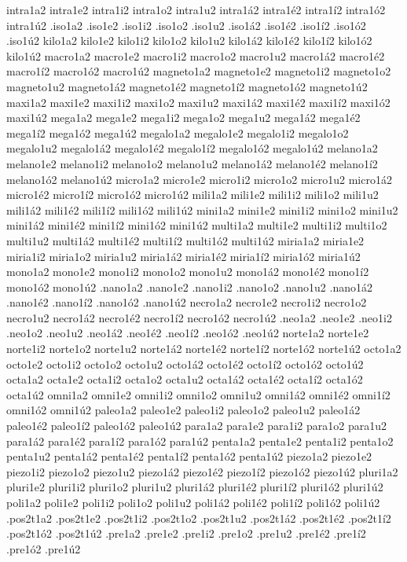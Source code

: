 {intra1a2 intra1e2 intra1i2 intra1o2 intra1u2 intra1á2 intra1é2 intra1í2 intra1ó2 intra1ú2 
.iso1a2 .iso1e2 .iso1i2 .iso1o2 .iso1u2 .iso1á2 .iso1é2 .iso1í2 .iso1ó2 .iso1ú2 
kilo1a2 kilo1e2 kilo1i2 kilo1o2 kilo1u2 kilo1á2 kilo1é2 kilo1í2 kilo1ó2 kilo1ú2 
macro1a2 macro1e2 macro1i2 macro1o2 macro1u2 macro1á2 macro1é2 macro1í2 macro1ó2 macro1ú2 
magneto1a2 magneto1e2 magneto1i2 magneto1o2 magneto1u2 magneto1á2 magneto1é2 magneto1í2 magneto1ó2 magneto1ú2 
maxi1a2 maxi1e2 maxi1i2 maxi1o2 maxi1u2 maxi1á2 maxi1é2 maxi1í2 maxi1ó2 maxi1ú2 
mega1a2 mega1e2 mega1i2 mega1o2 mega1u2 mega1á2 mega1é2 mega1í2 mega1ó2 mega1ú2 
megalo1a2 megalo1e2 megalo1i2 megalo1o2 megalo1u2 megalo1á2 megalo1é2 megalo1í2 megalo1ó2 megalo1ú2 
melano1a2 melano1e2 melano1i2 melano1o2 melano1u2 melano1á2 melano1é2 melano1í2 melano1ó2 melano1ú2 
micro1a2 micro1e2 micro1i2 micro1o2 micro1u2 micro1á2 micro1é2 micro1í2 micro1ó2 micro1ú2 
mili1a2 mili1e2 mili1i2 mili1o2 mili1u2 mili1á2 mili1é2 mili1í2 mili1ó2 mili1ú2 
mini1a2 mini1e2 mini1i2 mini1o2 mini1u2 mini1á2 mini1é2 mini1í2 mini1ó2 mini1ú2 
multi1a2 multi1e2 multi1i2 multi1o2 multi1u2 multi1á2 multi1é2 multi1í2 multi1ó2 multi1ú2 
miria1a2 miria1e2 miria1i2 miria1o2 miria1u2 miria1á2 miria1é2 miria1í2 miria1ó2 miria1ú2 
mono1a2 mono1e2 mono1i2 mono1o2 mono1u2 mono1á2 mono1é2 mono1í2 mono1ó2 mono1ú2 
.nano1a2 .nano1e2 .nano1i2 .nano1o2 .nano1u2 .nano1á2 .nano1é2 .nano1í2 .nano1ó2 .nano1ú2 
necro1a2 necro1e2 necro1i2 necro1o2 necro1u2 necro1á2 necro1é2 necro1í2 necro1ó2 necro1ú2 
.neo1a2 .neo1e2 .neo1i2 .neo1o2 .neo1u2 .neo1á2 .neo1é2 .neo1í2 .neo1ó2 .neo1ú2 
norte1a2 norte1e2 norte1i2 norte1o2 norte1u2 norte1á2 norte1é2 norte1í2 norte1ó2 norte1ú2 
octo1a2 octo1e2 octo1i2 octo1o2 octo1u2 octo1á2 octo1é2 octo1í2 octo1ó2 octo1ú2 
octa1a2 octa1e2 octa1i2 octa1o2 octa1u2 octa1á2 octa1é2 octa1í2 octa1ó2 octa1ú2 
omni1a2 omni1e2 omni1i2 omni1o2 omni1u2 omni1á2 omni1é2 omni1í2 omni1ó2 omni1ú2 
paleo1a2 paleo1e2 paleo1i2 paleo1o2 paleo1u2 paleo1á2 paleo1é2 paleo1í2 paleo1ó2 paleo1ú2 
para1a2 para1e2 para1i2 para1o2 para1u2 para1á2 para1é2 para1í2 para1ó2 para1ú2 
penta1a2 penta1e2 penta1i2 penta1o2 penta1u2 penta1á2 penta1é2 penta1í2 penta1ó2 penta1ú2 
piezo1a2 piezo1e2 piezo1i2 piezo1o2 piezo1u2 piezo1á2 piezo1é2 piezo1í2 piezo1ó2 piezo1ú2 
pluri1a2 pluri1e2 pluri1i2 pluri1o2 pluri1u2 pluri1á2 pluri1é2 pluri1í2 pluri1ó2 pluri1ú2 
poli1a2 poli1e2 poli1i2 poli1o2 poli1u2 poli1á2 poli1é2 poli1í2 poli1ó2 poli1ú2 
.pos2t1a2 .pos2t1e2 .pos2t1i2 .pos2t1o2 .pos2t1u2 .pos2t1á2 .pos2t1é2 .pos2t1í2 .pos2t1ó2 .pos2t1ú2 
.pre1a2 .pre1e2 .pre1i2 .pre1o2 .pre1u2         .pre1é2 .pre1í2 .pre1ó2 .pre1ú2 
}
